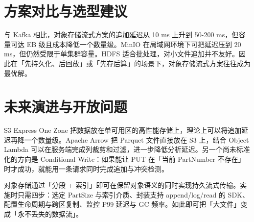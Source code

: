 \chapter{方案对比与选型建议}
与 Kafka 相比，对象存储流式方案的追加延迟从 10 ms 上升到 50-200 ms，但容量可达 EB 级且成本降低一个数量级。MinIO 在局域网环境下可把延迟压到 20 ms，但仍然受限于单集群容量。HDFS 适合批处理，对小文件追加并不友好。因此在「先持久化、后回放」或「先存后算」的场景下，对象存储流式方案往往成为最优解。\par
\chapter{未来演进与开放问题}
S3 Express One Zone 把数据放在单可用区的高性能存储上，理论上可以将追加延迟再降一个数量级。Apache Arrow 把 Parquet 文件直接放在 S3 上，结合 Object Lambda 可以在服务端完成列裁剪和过滤，进一步降低分析延迟。另一个尚未标准化的方向是 Conditional Write：如果能让 PUT 在「当前 PartNumber 不存在」时才成功，就能用一条请求同时完成追加与冲突检测。\par
对象存储通过「分段 + 索引」即可在保留对象语义的同时实现持久流式传输。实施时只需四步：选定 PartSize 与索引介质、封装支持 append/log/read 的 SDK、配置生命周期与跨区复制、监控 P99 延迟与 GC 频率。如此即可把「大文件」变成「永不丢失的数据流」。\par
